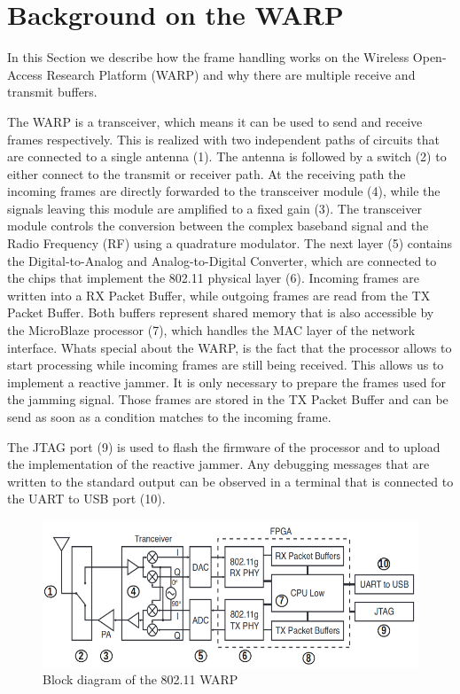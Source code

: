 \documentclass[sigconf]{acmart}
\begin{document}
\section{Background on the WARP}
In this Section we describe how the frame handling works on the Wireless Open-Access
Research Platform (WARP) and why there are multiple receive and transmit buffers.

The WARP is a transceiver, which means it can be used to send and receive frames respectively. This
is realized with two independent paths of circuits that are connected to a single antenna (1). 
The antenna is followed by a switch (2) to either connect to the transmit or receiver
path. At the receiving path the incoming frames are directly forwarded to the transceiver module
(4), while the signals leaving this module are amplified to a fixed gain (3). The transceiver module
controls the conversion between the complex baseband signal and the Radio Frequency (RF) using a
quadrature modulator. The next layer (5) contains the Digital-to-Analog and Analog-to-Digital
Converter, which are connected to the chips that implement the 802.11 physical layer (6). Incoming
frames are written into a RX Packet Buffer, while outgoing frames are read from the TX Packet
Buffer. Both buffers represent shared memory that is also accessible by the MicroBlaze processor (7),
which handles the MAC layer of the network interface. Whats special about the WARP, is the fact that
the processor allows to start processing while incoming frames are still being received. This
allows us to implement a reactive jammer. It is only necessary to prepare the frames used for the
jamming signal. Those frames are stored in the TX Packet Buffer and can be send as soon as a
condition matches to the incoming frame.

The JTAG port (9) is used to flash the firmware of the processor and to upload the implementation of
the reactive jammer. Any debugging messages that are written to the standard output can be observed
in a terminal that is connected to the UART to USB port (10).

\begin{figure}[tb!]
	\hfill
	\includegraphics[width=1\linewidth]{block_diagram_warp.png}
	\caption{Block diagram of the 802.11 WARP}
	\label{fig:block_diagram_warp}
\end{figure}
\end{document}
